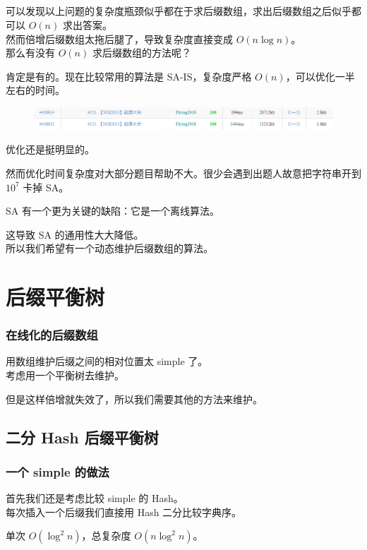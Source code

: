 \documentclass[UTF8]{beamer}
\begin{document}
\begin{CJK}{UTF8}{song}
\subsection{}
\begin{frame}
	可以发现以上问题的复杂度瓶颈似乎都在于求后缀数组，求出后缀数组之后似乎都可以 $O(n)$ 求出答案。\\
	然而倍增后缀数组太拖后腿了，导致复杂度直接变成 $O(n\log n)$。\\
	那么有没有 $O(n)$ 求后缀数组的方法呢？\\
	\pause
	\par
	肯定是有的。现在比较常用的算法是 SA-IS，复杂度严格 $O(n)$，可以优化一半左右的时间。\\
\end{frame}
\begin{frame}
	\begin{figure}[h]
		\centering
		\includegraphics[width=1.0\linewidth]{figures/compare.png}
	\end{figure}
	优化还是挺明显的。\\
	\pause
	\par
	然而优化时间复杂度对大部分题目帮助不大。很少会遇到出题人故意把字符串开到 $10^7$ 卡掉 SA。
\end{frame}
\begin{frame}
	SA 有一个更为关键的缺陷：它是一个离线算法。
	\pause
	\par
	这导致 SA 的通用性大大降低。\\
	所以我们希望有一个动态维护后缀数组的算法。
\end{frame}
\section{后缀平衡树}
\begin{frame}
	\frametitle{在线化的后缀数组}
	\pause
	\par
	用数组维护后缀之间的相对位置太 simple 了。\\
	考虑用一个平衡树去维护。
	\pause
	\par
	但是这样倍增就失效了，所以我们需要其他的方法来维护。
\end{frame}
\subsection{二分 Hash 后缀平衡树}
\begin{frame}
	\frametitle{一个 simple 的做法}
	首先我们还是考虑比较 simple 的 Hash。\\
	每次插入一个后缀我们直接用 Hash 二分比较字典序。
	\pause
	\par
	单次 $O(\log^2 n)$，总复杂度 $O(n\log^2 n)$。
\end{frame}

\end{CJK}
\end{document}
